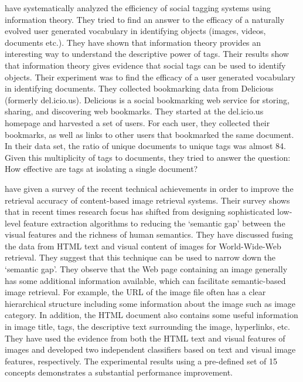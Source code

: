 
\citet*{chi2008understanding} have systematically analyzed the efficiency of social tagging systems using information theory. They tried to find an answer to the efficacy of a naturally evolved user generated vocabulary in identifying objects (images, videos, documents etc.). They have shown that information theory provides an interesting way to understand the descriptive power of tags. Their results show that information theory gives evidence that social tags can be used to identify
objects. Their experiment was to find the efficacy of a user generated vocabulary in identifying documents. They collected bookmarking data from Delicious (formerly del.icio.us). Delicious is a social bookmarking web service for storing, sharing, and discovering web bookmarks. They started at the del.icio.us homepage and harvested a set of users. For each user, they collected their bookmarks, as well as links to other users that bookmarked the same document. In their
data set, the ratio of unique documents to unique tags was almost 84. Given this multiplicity of tags to documents, they tried to answer the question: How effective are tags at isolating a single document?

\citet*{liu} have given a survey  of the recent technical
achievements in order to improve the retrieval accuracy of content-based
image retrieval systems.  Their survey shows that in recent times
research focus has shifted from designing sophisticated low-level
feature extraction algorithms to reducing the `semantic gap' between
the visual features and the richness of human semantics.  They have
discussed fusing the data from HTML text and visual content of
images for World-Wide-Web retrieval. They suggest that this
technique can be used to narrow down the `semantic gap'. They
observe that the Web page containing an image generally has some
additional information available, which can facilitate
semantic-based image retrieval. For example, the URL of the
image file often has a clear hierarchical structure including some
information about the image such as image category. In addition, the
HTML document also contains some useful information in image title,
tags, the descriptive text surrounding the image, hyperlinks, etc.
They have used the evidence from both the HTML text and visual
features of images and developed two independent classifiers based
on text and visual image features, respectively. The experimental
results using a pre-defined set of 15 concepts demonstrates a
substantial performance improvement.

